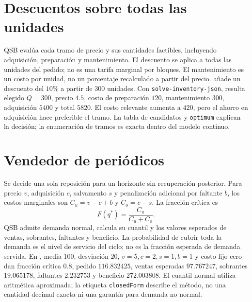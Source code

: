 \section{Descuentos sobre todas las unidades}
QSB evalúa cada tramo de precio y sus cantidades factibles, incluyendo
adquisición, preparación y mantenimiento. El descuento se aplica a todas las
unidades del pedido; no es una tarifa marginal por bloques. El mantenimiento
es un costo por unidad, no un porcentaje recalculado a partir del precio.
 añade un descuento del \(10\%\) a partir de
\(300\) unidades. Con \texttt{solve-inventory-json}, resulta elegido
\(Q=300\), precio \(4.5\), costo de preparación \(120\), mantenimiento
\(300\), adquisición \(5400\) y total \(5820\). El costo relevante aumenta a
\(420\), pero el ahorro en adquisición hace preferible el tramo. La tabla de
candidatos y \texttt{optimum} explican la decisión; la enumeración de tramos
es exacta dentro del modelo continuo.

\section{Vendedor de periódicos}
Se decide una sola reposición para un horizonte sin recuperación posterior.
Para precio \(v\), adquisición \(c\), salvamento \(s\) y penalización
adicional por faltante \(b\), los costos marginales son
\(C_u=v-c+b\) y \(C_o=c-s\). La fracción crítica es
\[
 F(q^*)=\frac{C_u}{C_u+C_o}.
\]
QSB admite demanda normal, calcula su cuantil y los valores esperados de ventas,
sobrantes, faltantes y beneficio. La probabilidad de cubrir toda la demanda es
el nivel de servicio del ciclo; no es la fracción esperada de demanda servida.
En , media \(100\), desviación \(20\),
\(v=5,c=2,s=1,b=1\) y costo fijo cero dan fracción crítica \(0.8\), pedido
\(116.832425\), ventas esperadas \(97.767247\), sobrantes \(19.065178\),
faltantes \(2.232753\) y beneficio \(272.003808\). El cuantil normal utiliza
aritmética aproximada; la etiqueta \texttt{closedForm} describe el método,
no una cantidad decimal exacta ni una garantía para demanda no normal.

